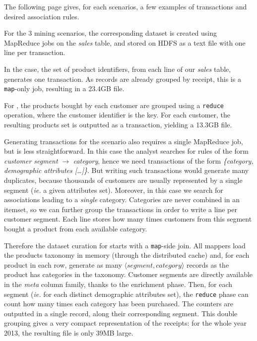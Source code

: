 The following page gives, for each scenarios,
a few examples of transactions and desired association rules.

\vfill
\pagebreak

\pagebreak
\clearpage


For the 3 mining scenarios,
the corresponding dataset is created using MapReduce jobs on the \textit{sales} table,
and stored on HDFS as a text file with one line per transaction.

In the \prodassocreceipt case,
the set of product identifiers, from each line of our \textit{sales} table, generates one transaction.
As records are already grouped by receipt, this is a \verb|map|-only job,
resulting in a 23.4GB file.

For \prodassocclient, the products bought by each customer are grouped using a \verb|reduce| operation,
where the customer identifier is the key.
For each customer, the resulting products set is outputted as a transaction,
yielding a 13.3GB file.

Generating transactions for the \demoassoc scenario also requires a single MapReduce job,
but is less straightforward.
In this case the analyst searches for rules of the form {\em customer segment} $\rightarrow$ {\em category},
hence we need transactions of the form {\em \{category, demographic attributes [\ldots]\}}.
But writing such transactions would generate many duplicates,
because thousands of customers are usually represented by a single segment ({\em ie.} a given attributes set).
Moreover, in this case we search for associations leading to a {\em single} category.
Categories are never combined in an itemset,
so we can further group the transactions in order to write a line per customer segment.
Each line stores how many times customers from this segment bought a product from each available category.

Therefore the dataset curation for \demoassoc starts with a \verb|map|-side join.
All mappers load the products taxonomy in memory (through the distributed cache) and,
for each product in each row,
generate as many $\langle \mathit{segment}, \mathit{category} \rangle$ records as
the product has categories in the taxonomy.
Customer segments are directly available in the \textit{meta} column family,
thanks to the enrichment phase.
Then, for each segment ({\em ie.} for each distinct demographic attributes set),
the \verb|reduce| phase can count how many times each category has been purchased.
The counters are outputted in a single record, along their corresponding segment.
This double grouping gives a very compact representation of the receipts:
for the whole year 2013, the resulting file is only 39MB large.

